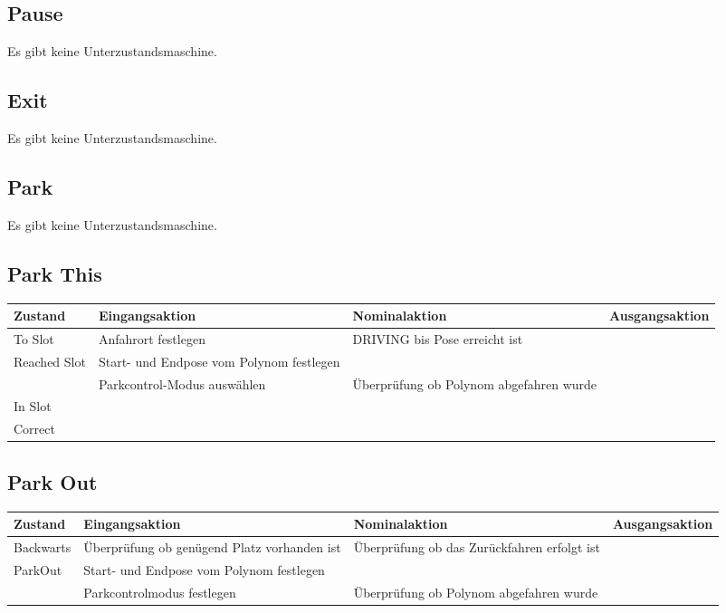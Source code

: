 \subsection{Pause}

Es gibt keine Unterzustandsmaschine.

\subsection{Exit}

Es gibt keine Unterzustandsmaschine.

\subsection{Park}

Es gibt keine Unterzustandsmaschine.

\subsection{Park This}

\begin{tabular}{|p{1.5cm}|p{4cm}|p{4cm}|p{3cm}|}
	\hline 
	Zustand & Eingangsaktion & Nominalaktion & Ausgangsaktion \\ 
	\hline 
	To Slot & Anfahrort festlegen & DRIVING bis Pose erreicht ist &  \\ 
	\hline 
	Reached Slot & Start- und Endpose vom Polynom festlegen &  &  \\ 
	\hline 
	 & Parkcontrol-Modus auswählen & Überprüfung ob Polynom abgefahren wurde &  \\ 
	\hline
	In Slot &  &  &  \\ 
	\hline 
	Correct &  &  &  \\ 
	\hline
\end{tabular} 

\subsection{Park Out}

\begin{tabular}{|p{1.7cm}|p{4cm}|p{4cm}|p{3cm}|}
	\hline 
	Zustand & Eingangsaktion & Nominalaktion & Ausgangsaktion \\ 
	\hline 
	Backwarts & Überprüfung ob genügend Platz vorhanden ist & Überprüfung ob das Zurückfahren erfolgt ist &  \\ 
	\hline 
	ParkOut & Start- und Endpose vom Polynom festlegen  &  &  \\ 
	\hline  
	& Parkcontrolmodus festlegen & Überprüfung ob Polynom abgefahren wurde &  \\ 
	\hline
 
\end{tabular} 